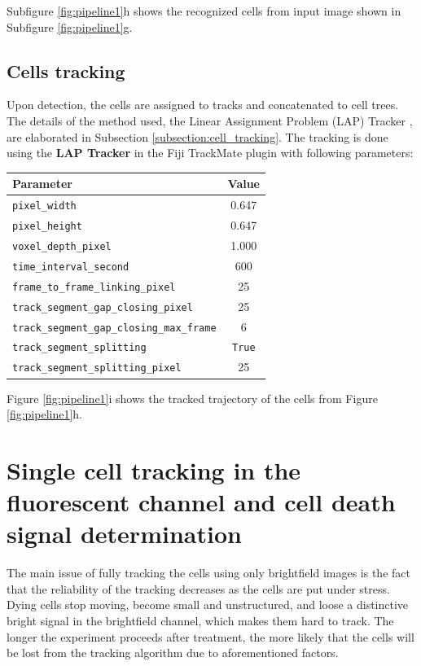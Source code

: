 \documentclass[pdftex,12pt,a4paper]{report}
\begin{document}
Subfigure \ref{fig:pipeline1}h shows the recognized cells from input image shown in Subfigure \ref{fig:pipeline1}g.

\subsection{Cells tracking}

Upon detection, the cells are assigned to tracks and concatenated to cell trees. The details of the method used, the Linear Assignment Problem (LAP) Tracker \cite{jaqaman2008robust}, are elaborated in Subsection \ref{subsection:cell_tracking}. The tracking is done using the \textbf{LAP Tracker} in the Fiji TrackMate plugin \cite{tinevez2017trackmate} with following parameters:

\begin{table}[H]
\centering
\begin{tabular}[t]{ l | c }
\hline
Parameter & Value \\
\hline\hline
\texttt{pixel\_width} & 0.647 \\
\texttt{pixel\_height} & 0.647 \\
\texttt{voxel\_depth\_pixel} & 1.000 \\
\texttt{time\_interval\_second} & 600\\
\texttt{frame\_to\_frame\_linking\_pixel} & 25 \\
\texttt{track\_segment\_gap\_closing\_pixel} & 25 \\
\texttt{track\_segment\_gap\_closing\_max\_frame} & 6 \\
\texttt{track\_segment\_splitting} & \texttt{True} \\
\texttt{track\_segment\_splitting\_pixel} & 25 \\
\end{tabular}
\end{table}


Figure \ref{fig:pipeline1}i shows the tracked trajectory of the cells from Figure \ref{fig:pipeline1}h.

\section{Single cell tracking in the fluorescent channel and cell death signal determination}
\label{section:pipeline_fluoroscent}

The main issue of fully tracking the cells using only brightfield images is the fact that the reliability of the tracking decreases as the cells are put under stress. Dying cells stop moving, become small and unstructured, and loose a distinctive bright signal in the brightfield channel, which makes them hard to track. The longer the experiment proceeds after treatment, the more likely that the cells will be lost from the tracking algorithm due to aforementioned factors.
\end{document}
